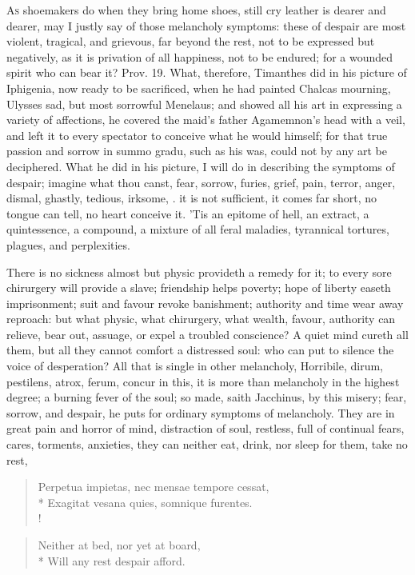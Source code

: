 {\lettrine{A}{s} shoemakers do when they bring home shoes, still cry leather is
dearer and dearer, may I justly say of those melancholy symptoms: these
of despair are most violent, tragical, and grievous, far beyond the
rest, not to be expressed but negatively, as it is privation of all
happiness, not to be endured; for a wounded spirit who can bear it?
Prov.  19. What, therefore, Timanthes did in his picture of
Iphigenia, now ready to be sacrificed, when he had painted Chalcas
mourning, Ulysses sad, but most sorrowful Menelaus; and showed all his
art in expressing a variety of affections, he covered the maid's father
Agamemnon's head with a veil, and left it to every spectator to
conceive what he would himself; for that true passion and sorrow in
summo gradu, such as his was, could not by any art be deciphered. What
he did in his picture, I will do in describing the symptoms of despair;
imagine what thou canst, fear, sorrow, furies, grief, pain, terror,
anger, dismal, ghastly, tedious, irksome, \etc{}. it is not sufficient, it
comes far short, no tongue can tell, no heart conceive it. 'Tis an
epitome of hell, an extract, a quintessence, a compound, a mixture of
all feral maladies, tyrannical tortures, plagues, and perplexities.

There is no sickness almost but physic provideth a remedy for it; to
every sore chirurgery will provide a slave; friendship helps poverty;
hope of liberty easeth imprisonment; suit and favour revoke banishment;
authority and time wear away reproach: but what physic, what
chirurgery, what wealth, favour, authority can relieve, bear out,
assuage, or expel a troubled conscience? A quiet mind cureth all them,
but all they cannot comfort a distressed soul: who can put to silence
the voice of desperation? All that is single in other melancholy,
Horribile, dirum, pestilens, atrox, ferum, concur in this, it is more
than melancholy in the highest degree; a burning fever of the soul; so
made, saith Jacchinus, by this misery; fear, sorrow, and despair,
he puts for ordinary symptoms of melancholy. They are in great pain and
horror of mind, distraction of soul, restless, full of continual fears,
cares, torments, anxieties, they can neither eat, drink, nor sleep for
them, take no rest,

\begin{latin}
\begin{verse}%
Perpetua impietas, nec mensae tempore cessat,\\*
Exagitat vesana quies, somnique furentes.\\!
\end{verse}%
\end{latin}
\translationrule%
\begin{verse}
Neither at bed, nor yet at board,\\*
Will any rest despair afford.
\end{verse}

}
